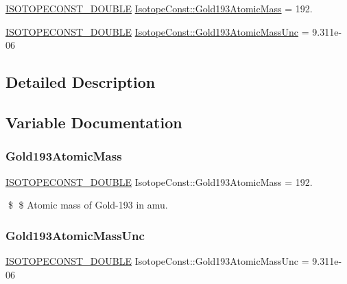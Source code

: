 \begin{DoxyCompactItemize}
\item 
\mbox{\hyperlink{group___isotope_const-_macros_ga8f45a7272ce02c0b4c65c44636ed719a}{I\+S\+O\+T\+O\+P\+E\+C\+O\+N\+S\+T\+\_\+\+D\+O\+U\+B\+LE}} \mbox{\hyperlink{group___isotope_const-_gold-_au193_ga1c326012b37bfad9f763124ac266e461}{Isotope\+Const\+::\+Gold193\+Atomic\+Mass}} = 192.
\item 
\mbox{\hyperlink{group___isotope_const-_macros_ga8f45a7272ce02c0b4c65c44636ed719a}{I\+S\+O\+T\+O\+P\+E\+C\+O\+N\+S\+T\+\_\+\+D\+O\+U\+B\+LE}} \mbox{\hyperlink{group___isotope_const-_gold-_au193_gad120dc26d64015ee0902138e279c0c36}{Isotope\+Const\+::\+Gold193\+Atomic\+Mass\+Unc}} = 9.\+311e-\/06
\end{DoxyCompactItemize}


\subsection{Detailed Description}


\subsection{Variable Documentation}
\mbox{\label{group___isotope_const-_gold-_au193_ga1c326012b37bfad9f763124ac266e461}} 
\subsubsection{\texorpdfstring{Gold193\+Atomic\+Mass}{Gold193AtomicMass}}
{\footnotesize\ttfamily \mbox{\hyperlink{group___isotope_const-_macros_ga8f45a7272ce02c0b4c65c44636ed719a}{I\+S\+O\+T\+O\+P\+E\+C\+O\+N\+S\+T\+\_\+\+D\+O\+U\+B\+LE}} Isotope\+Const\+::\+Gold193\+Atomic\+Mass = 192.}

\$ \$ Atomic mass of Gold-\/193 in amu. \mbox{\label{group___isotope_const-_gold-_au193_gad120dc26d64015ee0902138e279c0c36}} 
\subsubsection{\texorpdfstring{Gold193\+Atomic\+Mass\+Unc}{Gold193AtomicMassUnc}}
{\footnotesize\ttfamily \mbox{\hyperlink{group___isotope_const-_macros_ga8f45a7272ce02c0b4c65c44636ed719a}{I\+S\+O\+T\+O\+P\+E\+C\+O\+N\+S\+T\+\_\+\+D\+O\+U\+B\+LE}} Isotope\+Const\+::\+Gold193\+Atomic\+Mass\+Unc = 9.\+311e-\/06}

